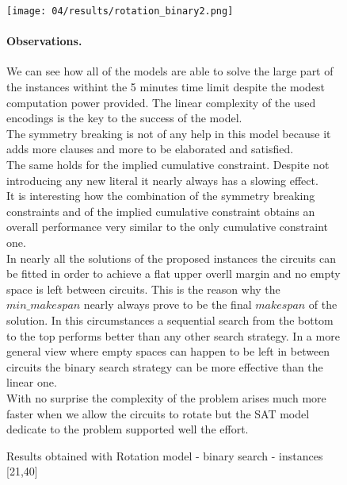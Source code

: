   \begin{figure}[H]
    \centering
    \texttt{[image: 04/results/rotation\_binary2.png]}
    \caption{
      Results obtained with Rotation model - binary search - instances [21,40]
    }
    \label{fig:SAT_results_rotation_binary2}



  \paragraph{Observations.}
  \raggedright
    We can see how all of the models are able to solve the large part
    of the instances withint the 5 minutes time limit despite the modest
    computation power provided. The linear complexity of the used
    encodings is the key to the success of the model.\\

    The symmetry breaking is not of any help in this model because it adds
    more clauses and more to be elaborated and satisfied.\\
    The same holds for the implied cumulative constraint. Despite 
    not introducing any new literal it nearly always has a slowing effect.\\

    It is interesting how the combination of the symmetry breaking constraints
    and of the implied cumulative constraint obtains an overall performance 
    very similar to the only cumulative constraint one.\\

    In nearly all the solutions of the proposed instances the circuits can be
    fitted in order to achieve a flat upper overll margin and no empty space 
    is left between circuits. This is the reason why the \(min\_makespan\) nearly
    always prove to be the final \(makespan\) of the solution.
    In this circumstances a sequential search from the bottom to the top performs 
    better than any other search strategy. In a more general view where empty spaces
    can happen to be left in between circuits the binary search strategy can be
    more effective than the linear one.\\

    With no surprise the complexity of the problem arises much more faster when we
    allow the circuits to rotate but the SAT model dedicate to the problem supported
    well the effort.


  \end{figure}